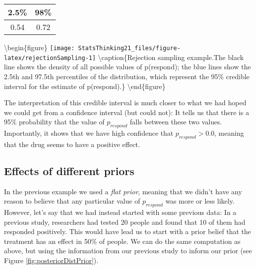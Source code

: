 \documentclass[]{book}
\theoremstyle{definition}
\theoremstyle{definition}
\theoremstyle{definition}
\theoremstyle{remark}
\begin{document}
\begin{longtable}[]{@{}cc@{}}
\toprule
\begin{minipage}[b]{0.09\columnwidth}\centering\strut
2.5\%\strut
\end{minipage} & \begin{minipage}[b]{0.09\columnwidth}\centering\strut
98\%\strut
\end{minipage}\tabularnewline
\midrule
\endhead
\begin{minipage}[t]{0.09\columnwidth}\centering\strut
0.54\strut
\end{minipage} & \begin{minipage}[t]{0.09\columnwidth}\centering\strut
0.72\strut
\end{minipage}\tabularnewline
\bottomrule
\end{longtable}

\textbackslash{}begin\{figure\}
\texttt{[image: StatsThinking21\_files/figure-latex/rejectionSampling-1]}
\textbackslash{}caption\{Rejection sampling example.The black line shows
the density of all possible values of p(respond); the blue lines show
the 2.5th and 97.5th percentiles of the distribution, which represent
the 95\% credible interval for the estimate of
p(respond).\}\label{fig:rejectionSampling} \textbackslash{}end\{figure\}

The interpretation of this credible interval is much closer to what we
had hoped we could get from a confidence interval (but could not): It
tells us that there is a 95\% probability that the value of
\(p_{respond}\) falls between these two values. Importantly, it shows
that we have high confidence that \(p_{respond} > 0.0\), meaning that
the drug seems to have a positive effect.

\subsection{Effects of different
priors}\label{effects-of-different-priors}

In the previous example we used a \emph{flat prior}, meaning that we
didn't have any reason to believe that any particular value of
\(p_{respond}\) was more or less likely. However, let's say that we had
instead started with some previous data: In a previous study,
researchers had tested 20 people and found that 10 of them had responded
positively. This would have lead us to start with a prior belief that
the treatment has an effect in 50\% of people. We can do the same
computation as above, but using the information from our previous study
to inform our prior (see Figure \ref{fig:posteriorDistPrior}).
\end{document}
